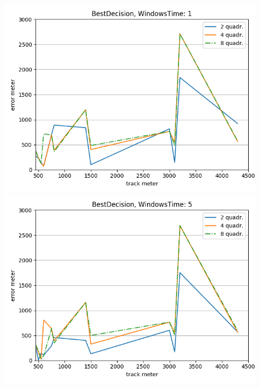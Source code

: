 \documentclass[12pt,a4paper,openright,twoside]{report}
\begin{document}
\begin{figure}[H]
\centering 
\includegraphics[scale=0.4]{thirdChartBestDecision-1} 
\includegraphics[scale=0.4]{thirdChartBestDecision-5} 
\end{figure}
\end{document}
